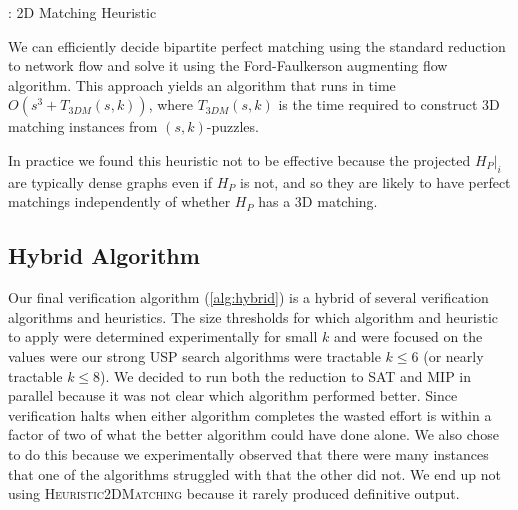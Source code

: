 \documentclass[11pt]{article}
\begin{document}
\begin{algorithm}
  \caption{: 2D Matching Heuristic}
  \label{alg:2dm}
\begin{algorithmic}[1]

  \Else
  \EndIf
  \EndFunction
\end{algorithmic}
\end{algorithm}

We can efficiently decide bipartite perfect matching using the
standard reduction to network flow and solve it using the
Ford-Faulkerson augmenting flow algorithm.  This approach yields an
algorithm that runs in time $O(s^3 + T_{3DM}(s,k))$, where
$T_{3DM}(s,k)$ is the time required to construct 3D matching instances
from $(s,k)$-puzzles.

In practice we found this heuristic not to be effective because the
projected $H_P|_i$ are typically dense graphs even if $H_P$ is not,
and so they are likely to have perfect matchings independently of
whether $H_P$ has a 3D matching.



\subsection{Hybrid Algorithm}

Our final verification algorithm (\autoref{alg:hybrid}) is a hybrid of
several verification algorithms and heuristics.  The size thresholds
for which algorithm and heuristic to apply were determined
experimentally for small $k$ and were focused on the values were our
strong USP search algorithms were tractable $k \le 6$ (or nearly
tractable $k \le 8$).  We decided to run both the reduction to SAT and
MIP in parallel because it was not clear which algorithm performed
better.  Since verification halts when either algorithm completes the
wasted effort is within a factor of two of what the better algorithm
could have done alone.  We also chose to do this because we
experimentally observed that there were many instances that one of the
algorithms struggled with that the other did not.  We end up not using
\textsc{Heuristic2DMatching} because it rarely produced definitive
output.
\end{document}
